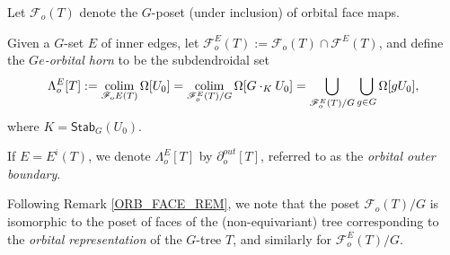 \documentclass[a4paper,10pt,draft]{article}%
\begin{document}
\begin{definition}
      Let $\mathscr{F}_{o}(T)$ denote the $G$-poset (under inclusion) of orbital face maps.
      
      Given a $G$-set $E$ of inner edges, let
      $\mathscr{F}_{o}^{E}(T) := \mathscr{F}_{o}(T) \cap \mathscr{F}^E(T)$,
      and define the \textit{$Ge$-orbital horn} to be the subdendroidal set
      \begin{equation}
            \Lambda^{E}_{o}[T] :=
            \mathop{\operatorname{colim}}\limits_{\mathscr{F}_o{E}(T)}\Omega[U_0]
            = \mathop{\operatorname{colim}}\limits_{\mathscr{F}_{o}^{E}(T)/G}\Omega[G\cdot_K U_0]
            = \mathop{\bigcup}\limits_{\mathscr{F}_o^{E}(T)/G} \mathop{\bigcup}\limits_{g \in G}\Omega[g U_0], 
      \end{equation}
      where $K = \mathsf{Stab}_G(U_0)$.

      If $E = E^i(T)$, we denote $\Lambda^{E}_o[T]$ by $\partial^{out}_o[T]$,
      referred to as the \textit{orbital outer boundary}.      
\end{definition}


\begin{remark}
      Following Remark \ref{ORB_FACE_REM}, we note that
      the poset $\mathscr{F}_o(T)/G$ is isomorphic to
      the poset of faces of the (non-equivariant) tree corresponding to the
      \textit{orbital representation} of the $G$-tree $T$,
      and similarly for $\mathscr{F}^E_o(T)/G$.
\end{remark}
\end{document}
